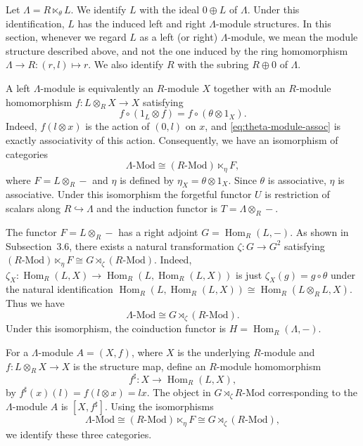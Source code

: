 \documentclass[11pt,reqno]{amsart}
\numberwithin{equation}{section}
\newcommand{\Hom}{\operatorname{Hom}}
\newcommand{\Mod}{\text{-}\mathrm{Mod}}
\begin{document}
Let $\Lambda=R\ltimes_\theta L$. We identify $L$ with the ideal $0\oplus L$ of $\Lambda$. Under this identification, $L$ has the induced left and right $\Lambda$-module structures.
In this section, whenever we regard $L$ as a left (or right)
$\Lambda$-module, we mean the module structure described above, and not the one induced by the ring homomorphism $\Lambda\to R: (r,l)\mapsto r$.
We also identify $R$ with the subring $R\oplus0$ of $\Lambda$.

A left $\Lambda$-module is equivalently an $R$-module $X$ together with an $R$-module homomorphism
$
f\colon L\otimes_RX\longrightarrow X
$
satisfying
\begin{equation}\label{eq:theta-module-assoc}
f\circ (1_L\otimes f)=f\circ(\theta\otimes1_X).
\end{equation}
Indeed, $f(l\otimes x)$ is the action of $(0,l)$ on $x$, and \eqref{eq:theta-module-assoc} is exactly associativity of this action. Consequently,
we have an isomorphism of categories
\[
\Lambda\text{-Mod}\cong (R\text{-Mod})\ltimes_\eta F,
\]
where $F=L\otimes_R-$ and $\eta$ is defined by $\eta_X=\theta\otimes1_X.$ Since $\theta$ is associative, $\eta$ is associative.
Under this isomorphism the forgetful functor $U$ is restriction of scalars along $R\hookrightarrow\Lambda$ and the induction functor is $T=\Lambda\otimes_R-$.

The functor $F=L\otimes_R-$ has a right adjoint
$
G=\Hom_R(L,-).
$
As shown in Subsection~3.6, there exists a natural transformation $\zeta\colon G\to G^2$ satisfying $(R\text{-Mod})\ltimes_\eta F\cong G\rtimes_\zeta (R\text{-Mod})$.
Indeed, $\zeta_X\colon \Hom_R(L,X)\to \Hom_R(L,\Hom_R(L,X))$ is just $\zeta_X(g)=g\circ \theta$ under the natural identification
$
\Hom_R(L,\Hom_R(L,X))\cong \Hom_R(L\otimes_R L, X).
$
Thus we have
\[
\Lambda\Mod\cong G\rtimes_\zeta (R\text{-Mod}).
\]
Under this isomorphism, the coinduction functor is $H=\Hom_R(\Lambda,-)$.

For a $\Lambda$-module $A=(X,f)$, where $X$ is the underlying $R$-module and $f\colon L\otimes_R X\to X$ is the structure map, define an $R$-module homomorphism
\[
f^\sharp\colon X\longrightarrow\Hom_R(L,X),
\]
by $f^\sharp(x)(l)=f(l\otimes x)=lx.$
The object in $G\rtimes_\zeta R\text{-Mod}$ corresponding to the $\Lambda$-module $A$ is $[X,f^\sharp]$. Using the isomorphisms
\[
\Lambda\text{-Mod}\cong (R\text{-Mod})\ltimes_\eta F\cong G\rtimes_\zeta (R\text{-Mod}),
\]
we identify these three categories.
\end{document}
